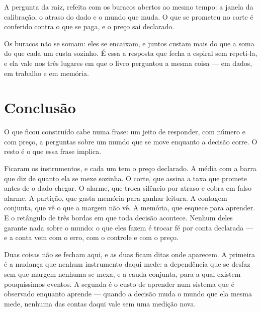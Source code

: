 \documentclass[12pt]{book}
\theoremstyle{definition}
\theoremstyle{remark}
\begin{document}
A pergunta da raiz, refeita com os buracos abertos ao mesmo tempo: a janela da calibração, o
atraso do dado e o mundo que muda. O que se prometeu no corte é conferido contra o
que se paga, e o preço sai declarado.

Os buracos não se somam: eles se encaixam, e juntos custam mais do que a soma do que cada um
custa sozinho. É essa a resposta que fecha a espiral sem repeti-la, e ela vale nos três lugares
em que o livro perguntou a mesma coisa --- em dados, em trabalho e em memória.







\chapter*{Conclusão}

O que ficou construído cabe numa frase: um jeito de responder, com número e com preço, a
perguntas sobre um mundo que se move enquanto a decisão corre. O resto é o que essa frase
implica.

Ficaram os instrumentos, e cada um tem o preço declarado. A média com a barra que diz de quanto
ela se mexe sozinha. O corte, que assina a taxa que promete antes de o dado chegar. O alarme, que
troca silêncio por atraso e cobra em falso alarme. A partição, que gasta memória para ganhar
leitura. A contagem conjunta, que vê o que a margem não vê. A memória, que esquece para
aprender. E o retângulo de três bordas em que toda decisão acontece. Nenhum deles garante nada
sobre o mundo: o que eles fazem é trocar fé por conta declarada --- e a conta vem com o erro,
com o controle e com o preço.

Duas coisas não se fecham aqui, e as duas ficam ditas onde aparecem. A primeira é a mudança que
nenhum instrumento daqui mede: a dependência que se desfaz sem que margem nenhuma se mexa, e a
cauda conjunta, para a qual existem pouquíssimos eventos. A segunda é o custo de aprender num
sistema que é observado enquanto aprende --- quando a decisão muda o mundo que ela mesma mede,
nenhuma das contas daqui vale sem uma medição nova.
\end{document}

